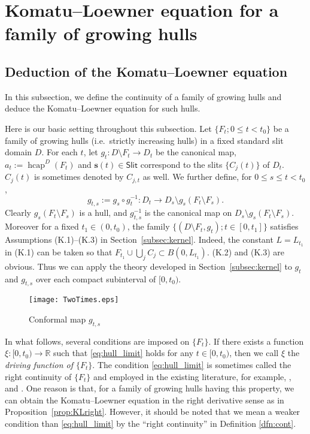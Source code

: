 \documentclass[preprint,12pt]{elsarticle}
\theoremstyle{definition}
\newcommand{\R}{\mathbb{R}}
\newcommand{\Slit}{\mathsf{Slit}}
\newcommand{\slit}{\mathbf{s}}
\DeclareMathOperator{\hcap}{hcap}
\begin{document}
\section{Komatu--Loewner equation for a family of growing hulls}
\label{sec:KLeq}

\subsection{Deduction of the Komatu--Loewner equation}
\label{subsec:deduction}

In this subsection, we define the continuity of a family of growing hulls
and deduce the Komatu--Loewner equation for such hulls.

Here is our basic setting throughout this subsection.
Let $\{F_t; 0 \leq t < t_0\}$ be a family of growing hulls
(i.e.\ strictly increasing hulls) in a fixed standard slit domain $D$.
For each $t$, let $g_t \colon D \setminus F_t \to D_t$ be the canonical map,
$a_t:=\hcap^D(F_t)$ and $\slit(t) \in \Slit$ correspond to the slits $\{C_j(t)\}$
of $D_t$.
$C_j(t)$ is sometimes denoted by $C_{j,t}$ as well.
We further define, for $0 \leq s \leq t < t_0$,
\[
g_{t,s}:=g_s \circ g_t^{-1} \colon D_t \to D_s \setminus g_s(F_t \setminus F_s).
\]
Clearly $g_s(F_t \setminus F_s)$ is a hull, and
$g_{t,s}^{-1}$ is the canonical map on $D_s \setminus g_s(F_t \setminus F_s)$.
Moreover for a fixed $t_1 \in (0, t_0)$,
the family $\{(D \setminus F_t, g_t); t \in [0, t_1]\}$
satisfies Assumptions (K.1)--(K.3) in Section~\ref{subsec:kernel}.
Indeed, the constant $L=L_{t_1}$ in (K.1) can be taken so that
$F_{t_1} \cup \bigcup_j C_j \subset B(0, L_{t_1})$.
(K.2) and (K.3) are obvious.
Thus we can apply the theory developed in Section~\ref{subsec:kernel}
to $g_t$ and $g_{t, s}$ over each compact subinterval of $[0, t_0)$.

\begin{figure}
\centering
\texttt{[image: TwoTimes.eps]}
\caption{Conformal map $g_{t,s}$}
\end{figure}

In what follows, several conditions are imposed on $\{F_t\}$.
If there exists a function $\xi \colon [0, t_0) \to \R$ such that
\eqref{eq:hull_limit} holds for any $t \in [0, t_0)$,
then we call $\xi$ the \emph{driving function of $\{F_t\}$}.
The condition \eqref{eq:hull_limit} is sometimes called the right continuity of $\{F_t\}$
and employed in the existing literature, for example,
\cite[Section~4.1]{La05}, \cite[Section~4]{La06} and \cite[Section~6]{CF18}.
One reason is that, for a family of growing hulls having this property,
we can obtain the Komatu--Loewner equation
in the right derivative sense as in Proposition~\ref{prop:KLright}.
However, it should be noted that we mean a weaker condition
than \eqref{eq:hull_limit} by the ``right continuity'' in Definition \ref{dfn:cont}.
\end{document}
